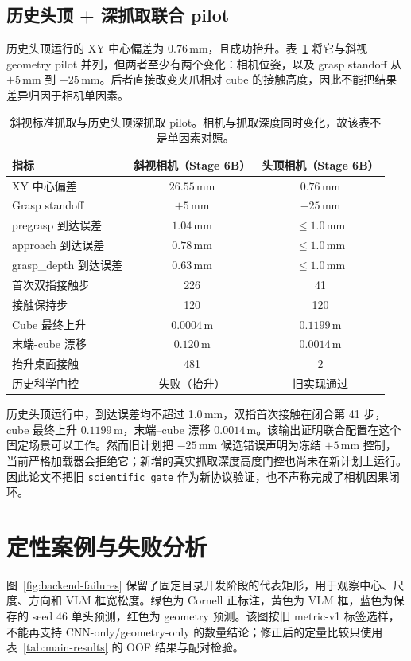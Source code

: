 \documentclass{l4proj}
\begin{document}
\subsection{历史头顶 + 深抓取联合 pilot}
历史头顶运行的 XY 中心偏差为 $0.76$\,mm，且成功抬升。表~\ref{tab:overhead-grasp} 将它与斜视 geometry pilot 并列，但两者至少有两个变化：相机位姿，以及 grasp standoff 从 $+5$\,mm 到 $-25$\,mm。后者直接改变夹爪相对 cube 的接触高度，因此不能把结果差异归因于相机单因素。

\begin{table}[htbp]
  \centering
  \caption{斜视标准抓取与历史头顶深抓取 pilot。相机与抓取深度同时变化，故该表不是单因素对照。}
  \label{tab:overhead-grasp}
  \begin{tabular}{lcc}
    \toprule
    指标 & 斜视相机（Stage 6B） & 头顶相机（Stage 6B） \\
    \midrule
    XY 中心偏差 & $26.55$\,mm & $0.76$\,mm \\
    Grasp standoff & $+5$\,mm & $-25$\,mm \\
    pregrasp 到达误差 & $1.04$\,mm & $\leq1.0$\,mm \\
    approach 到达误差 & $0.78$\,mm & $\leq1.0$\,mm \\
    grasp\_depth 到达误差 & $0.63$\,mm & $\leq1.0$\,mm \\
    首次双指接触步 & 226 & 41 \\
    接触保持步 & 120 & 120 \\
    Cube 最终上升 & $0.0004$\,m & $0.1199$\,m \\
    末端-cube 漂移 & $0.120$\,m & $0.0014$\,m \\
    抬升桌面接触 & 481 & 2 \\
    历史科学门控 & 失败（抬升） & 旧实现通过 \\
    \bottomrule
  \end{tabular}
\end{table}

历史头顶运行中，到达误差均不超过 1.0\,mm，双指首次接触在闭合第 41 步，cube 最终上升 $0.1199$\,m，末端--cube 漂移 $0.0014$\,m。该输出证明联合配置在这个固定场景可以工作。然而旧计划把 $-25$\,mm 候选错误声明为冻结 $+5$\,mm 控制，当前严格加载器会拒绝它；新增的真实抓取深度高度门控也尚未在新计划上运行。因此论文不把旧 \texttt{scientific\_gate} 作为新协议验证，也不声称完成了相机因果闭环。

\section{定性案例与失败分析}
图~\ref{fig:backend-failures} 保留了固定目录开发阶段的代表矩形，用于观察中心、尺度、方向和 VLM 框宽松度。绿色为 Cornell 正标注，黄色为 VLM 框，蓝色为保存的 seed 46 单头预测，红色为 geometry 预测。该图按旧 metric-v1 标签选样，不能再支持 CNN-only/geometry-only 的数量结论；修正后的定量比较只使用表~\ref{tab:main-results} 的 OOF 结果与配对检验。
\end{document}
